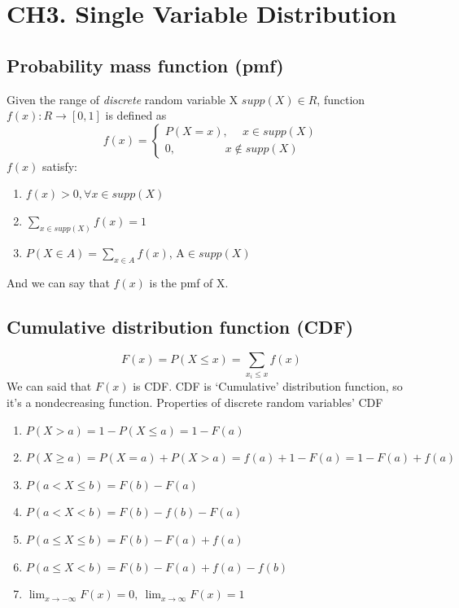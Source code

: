 \documentclass[12pt]{article}
\begin{document}

    \section*{CH3. Single Variable Distribution}
        \subsection*{Probability mass function (pmf)}
        Given the range of \emph{discrete} random variable X $supp(X)\in R$, function $f(x): R\rightarrow [0,1]$ is defined as
        \begin{equation}
            f(x)=
            \begin{cases}
                P(X=x), \quad\ x \in supp(X)\\
                0, \quad\ \quad\ \quad\ \ \ \ x\notin supp(X)
            \end{cases}
        \end{equation}
        $f(x)$ satisfy:
        \begin{enumerate}
            \item $f(x)>0, \forall x \in supp(X)$
            \item $\sum_{x\in supp(X)}f(x)=1$
            \item $P(X\in A)=\sum_{x \in A}f(x)$, A$\in supp(X)$
        \end{enumerate} 
        And we can say that $f(x)$ is the pmf of X.
        \subsection*{Cumulative distribution function (CDF)}
        \begin{equation}
            F(x)=P(X\leq x)=\sum_{x_i\leq x}f(x)
        \end{equation}
        We can said that $F(x)$ is CDF.
        \newline
        CDF is `Cumulative' distribution function, so it's a nondecreasing function.
        \newline
        \newline
        Properties of discrete random variables' CDF
        \begin{enumerate}
            \item $P(X>a) = 1-P(X\leq a)= 1-F(a)$
            \item $P(X\geq a)= P(X=a)+P(X>a)=f(a)+1-F(a)=1-F(a)+f(a)$
            \item $P(a<X\leq b) = F(b)-F(a)$
            \item $P(a<X<b)=F(b)-f(b)-F(a)$
            \item $P(a\leq X \leq b)=F(b)-F(a)+f(a)$
            \item $P(a \leq X < b)=F(b)-F(a)+f(a)-f(b)$
            \item $\lim_{x \to -\infty}F(x)=0,\ \lim_{x\to\infty} F(x)=1$
        \end{enumerate}
\end{document}
